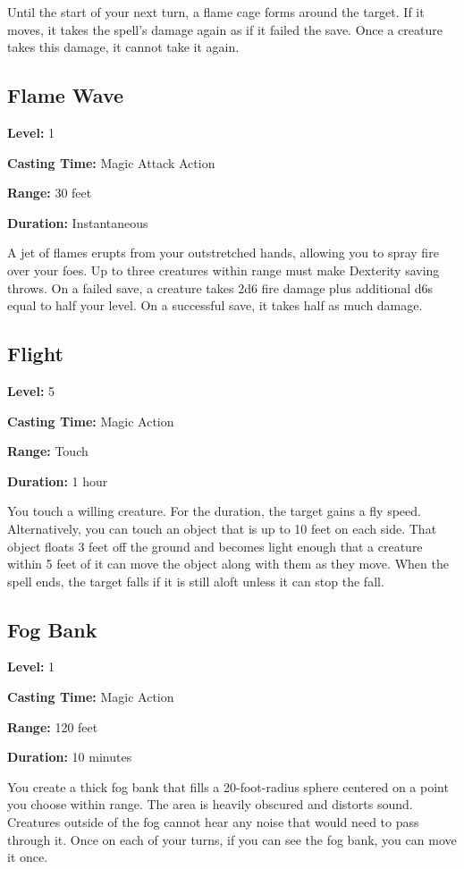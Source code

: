 \documentclass[12pt,letterpaper,twocolumn,openany,nodeprecatedcode,bg=none]{dndbook}
\begin{document}
Until the start of your next turn, a flame cage forms around the target.
If it moves, it takes the spell's damage again as if it failed the save.
Once a creature takes this damage, it cannot take it again.

\subsection{Flame Wave}\label{flame-wave}

\textbf{Level:} 1

\textbf{Casting Time:} Magic Attack Action

\textbf{Range:} 30 feet

\textbf{Duration:} Instantaneous

A jet of flames erupts from your outstretched hands, allowing you to
spray fire over your foes. Up to three creatures within range must make
Dexterity saving throws. On a failed save, a creature takes 2d6 fire
damage plus additional d6s equal to half your level. On a successful
save, it takes half as much damage.

\subsection{Flight}\label{flight}

\textbf{Level:} 5

\textbf{Casting Time:} Magic Action

\textbf{Range:} Touch

\textbf{Duration:} 1 hour

You touch a willing creature. For the duration, the target gains a fly
speed. Alternatively, you can touch an object that is up to 10 feet on
each side. That object floats 3 feet off the ground and becomes light
enough that a creature within 5 feet of it can move the object along
with them as they move. When the spell ends, the target falls if it is
still aloft unless it can stop the fall.

\subsection{Fog Bank}\label{fog-bank}

\textbf{Level:} 1

\textbf{Casting Time:} Magic Action

\textbf{Range:} 120 feet

\textbf{Duration:} 10 minutes

You create a thick fog bank that fills a 20-foot-radius sphere centered
on a point you choose within range. The area is heavily obscured and
distorts sound. Creatures outside of the fog cannot hear any noise that
would need to pass through it. Once on each of your turns, if you can
see the fog bank, you can move it once.
\end{document}
